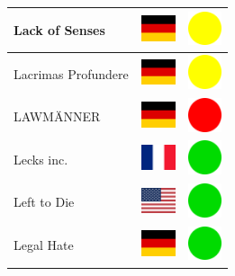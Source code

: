 \documentclass[12pt, a4paper, twoside]{report}
\begin{document}
\begin{center}
\begin{longtable}{|p{5cm}|p{2cm}|p{2cm}|}
 Lack of Senses                                             & \includegraphics[width=1cm]{../img/flags/de} &   \includegraphics[width=1cm]{../likes/m} \\ \hline
 Lacrimas Profundere                                        & \includegraphics[width=1cm]{../img/flags/de} &   \includegraphics[width=1cm]{../likes/m} \\ \hline
 LAWMÄNNER                                                  & \includegraphics[width=1cm]{../img/flags/de} &   \includegraphics[width=1cm]{../likes/n} \\ \hline
 Lecks inc.                                                 & \includegraphics[width=1cm]{../img/flags/fr} &   \includegraphics[width=1cm]{../likes/y} \\ \hline
 Left to Die                                                & \includegraphics[width=1cm]{../img/flags/us} &   \includegraphics[width=1cm]{../likes/y} \\ \hline
 Legal Hate                                                 & \includegraphics[width=1cm]{../img/flags/de} &   \includegraphics[width=1cm]{../likes/y} \\ \hline

\end{longtable}
\end{center}
\end{document}
